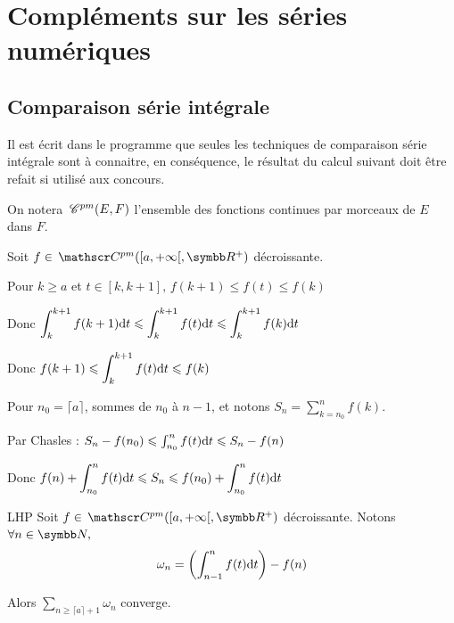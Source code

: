 \section{Compléments sur les séries numériques}
\subsection{Comparaison série intégrale}

Il est écrit dans le programme que seules les techniques de comparaison série intégrale sont à connaitre, en conséquence, le résultat du calcul suivant doit être refait si utilisé aux concours. 

On notera $\,\mathscr C^{pm}(E, F)$ l'ensemble des fonctions continues par morceaux de $E$ dans $F$.

Soit $f \in \mc{pm}( [a, + \infty[ , \R^+)$ décroissante. 

Pour $k \geqslant a$ et $ t \in [k, k+ 1 ], \, f(k + 1) \leqslant f(t) \leqslant f(k)$

Donc $\displaystyle \int_{k}^{k + 1} f(k + 1) \text d t \leqslant \int_{k}^{k + 1} f(t) \text d t \leqslant \int_{k}^{k + 1} f(k) \text d t$

Donc $\displaystyle f(k + 1) \leqslant \int_{k}^{k + 1} f(t) \text d t \leqslant f(k)$

Pour $n_0 = \lceil a \rceil$, sommes de $n_0$ à $n - 1$, et notons $\displaystyle S_n = \sum_{k = n_0}^{n} f(k)$.

Par Chasles : $S_n - f(n_0) \leqslant \int_{n_0}^{n} f(t) \text d t \leqslant S_n - f(n)$

Donc $\displaystyle f(n) + \int_{n_0}^{n} f(t) \text d t \leqslant S_n \leqslant f(n_0) + \int_{n_0}^{n} f(t) \text d t$

\begin{theoreme}{LHP}{}
    Soit $f \in \mc{pm}([a, + \infty[, \R^+)$ décroissante. 
    Notons $\forall n \in \N,$ 
    \[\omega_n = \left( \int_{n - 1 }^{n } f(t) \text d t \right) - f(n)\]

    Alors $\displaystyle \sum_{n \geqslant \lceil a \rceil + 1} \omega_n$ converge.
\end{theoreme}


